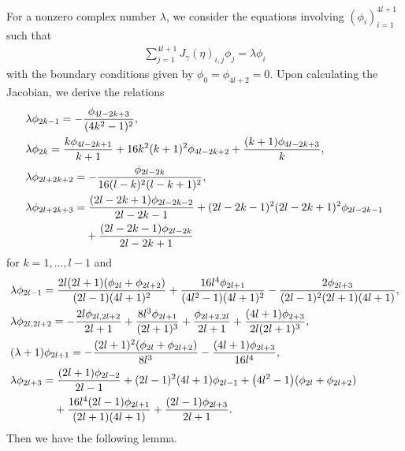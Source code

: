 \documentclass[pdftex]{sigma}
\numberwithin{equation}{section}
\begin{document}
For a nonzero complex number $\lambda$, we consider the equations involving $(\phi_i)_{i=1}^{4l+1}$ such that
	\begin{align}\label{Beq}
	\sum_{j=1}^{4l+1}J_\gamma(\eta)_{i,j}\phi_j=\lambda\phi_i
	\end{align}
with the boundary conditions given by $\phi_0=\phi_{4l+2}=0$.
Upon calculating the Jacobian, we derive the relations
	\begin{align}
	\label{Br1}&\lambda\phi_{2k-1}=-\frac{\phi_{4l-2k+3}}{(4k^2-1)^2},\\
	\label{Br2}&\lambda\phi_{2k}=\frac{k\phi_{4l-2k+1}}{k+1}+16k^2(k+1)^2\phi_{4l-2k+2}+\frac{(k+1)\phi_{4l-2k+3}}{k},\\
	\label{Br3}&\lambda\phi_{2l+2k+2}=-\frac{\phi_{2l-2k}}{16(l-k)^2(l-k+1)^2},\\
&\lambda\phi_{2l+2k+3}=\frac{(2l-2k+1)\phi_{2l-2k-2}}{2l-2k-1}+(2l-2k-1)^2(2l-2k+1)^2\phi_{2l-2k-1}\nonumber\\
	&\hphantom{\lambda\phi_{2l+2k+3}=}{}+\frac{(2l-2k-1)\phi_{2l-2k}}{2l-2k+1}\label{Br4}
	\end{align}
for $k=1,\dots,l-1$ and
	\begin{align}
	\label{Br5}&\lambda\phi_{2l-1}=\frac{2l(2l+1)(\phi_{2l}+\phi_{2l+2})}{(2l-1)(4l+1)^2}+\frac{16l^4\phi_{2l+1}}{(4l^2-1)(4l+1)^2}-\frac{2\phi_{2l+3}}{(2l-1)^2(2l+1)(4l+1)},\\
	\label{Br6}&\lambda\phi_{2l,2l+2}=-\frac{2l\phi_{2l,2l+2}}{2l+1}+\frac{8l^3\phi_{2l+1}}{(2l+1)^3}+\frac{\phi_{2l+2,2l}}{2l+1}+\frac{(4l+1)\phi_{2+3}}{2l(2l+1)^3},\\
	\label{Br7}&(\lambda+1)\phi_{2l+1}=-\frac{(2l+1)^2(\phi_{2l}+\phi_{2l+2})}{8l^3}-\frac{(4l+1)\phi_{2l+3}}{16l^4},\\
&\lambda\phi_{2l+3}=\frac{(2l+1)\phi_{2l-2}}{2l-1}+(2l-1)^2(4l+1)\phi_{2l-1}+\bigl(4l^2-1\bigr)(\phi_{2l}+\phi_{2l+2})\nonumber\\
	&\hphantom{\lambda\phi_{2l+3}=}{}+\frac{16l^4(2l-1)\phi_{2l+1}}{(2l+1)(4l+1)}+\frac{(2l-1)\phi_{2l+3}}{2l+1}.\label{Br8}
	\end{align}
Then we have the following lemma.
\end{document}
